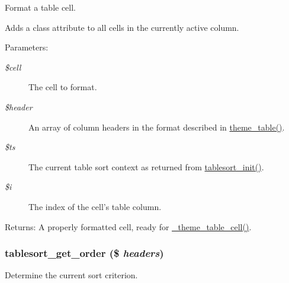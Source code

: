 Format a table cell.

Adds a class attribute to all cells in the currently active column.

\begin{Desc}
\item[Parameters:]
\begin{description}
\item[{\em \$cell}]The cell to format. \item[{\em \$header}]An array of column headers in the format described in \hyperlink{group__themeable_g77f053aaa73bbeaa3943bf8f06ce625d}{theme\_\-table()}. \item[{\em \$ts}]The current table sort context as returned from \hyperlink{tablesort_8inc_fee7fc97d83c8e51399e9b41ccbae927}{tablesort\_\-init()}. \item[{\em \$i}]The index of the cell's table column. \end{description}
\end{Desc}
\begin{Desc}
\item[Returns:]A properly formatted cell, ready for \hyperlink{includes_2theme_8inc_df2a29e2c6631b7c0ecd833cafda9b40}{\_\-theme\_\-table\_\-cell()}. \end{Desc}
\hypertarget{tablesort_8inc_185527ebc6d0d3f4b8681b60debddf21}{
\subsubsection[{tablesort\_\-get\_\-order}]{\setlength{\rightskip}{0pt plus 5cm}tablesort\_\-get\_\-order (\$ {\em headers})}}
\label{tablesort_8inc_185527ebc6d0d3f4b8681b60debddf21}


Determine the current sort criterion.

